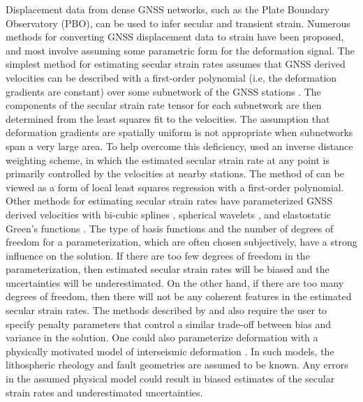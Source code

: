 \documentclass[extra,mreferee]{gji}
\begin{document}
Displacement data from dense GNSS networks, such as the Plate Boundary
Observatory (PBO), can be used to infer secular and transient strain.
Numerous methods for converting GNSS displacement data to strain have
been proposed, and most involve assuming some parametric form for the
deformation signal. The simplest method for estimating secular strain
rates assumes that GNSS derived velocities can be described with a
first-order polynomial (i.e, the deformation gradients are constant)
over some subnetwork of the GNSS stations \citep[e.g.,][]{Feigl1990,
Murray2000}. The components of the secular strain rate tensor for each
subnetwork are then determined from the least squares fit to the
velocities. The assumption that deformation gradients are spatially
uniform is not appropriate when subnetworks span a very large area. To
help overcome this deficiency, \citet{Shen1996,Shen2015} used an
inverse distance weighting scheme, in which the estimated secular
strain rate at any point is primarily controlled by the velocities at
nearby stations. The method of \citet{Shen1996,Shen2015} can be viewed
as a form of local least squares regression with a first-order
polynomial. Other methods for estimating secular strain rates have
parameterized GNSS derived velocities with bi-cubic splines
\citep{Beavan2001}, spherical wavelets \citep{Tape2009}, and
elastostatic Green's functions \citep{Sandwell2016}. The type of basis
functions and the number of degrees of freedom for a parameterization,
which are often chosen subjectively, have a strong influence on the
solution. If there are too few degrees of freedom in the
parameterization, then estimated secular strain rates will be biased
and the uncertainties will be underestimated. On the other hand, if
there are too many degrees of freedom, then there will not be any
coherent features in the estimated secular strain rates. The methods
described by \citet{Beavan2001} and \citet{Tape2009} also require the
user to specify penalty parameters that control a similar trade-off
between bias and variance in the solution. One could also parameterize
deformation with a physically motivated model of interseismic
deformation \citep[e.g.,][]{Meade2005, McCaffrey2007}. In such models,
the lithospheric rheology and fault geometries are assumed to be
known. Any errors in the assumed physical model could result in biased
estimates of the secular strain rates and underestimated
uncertainties.

\end{document}
